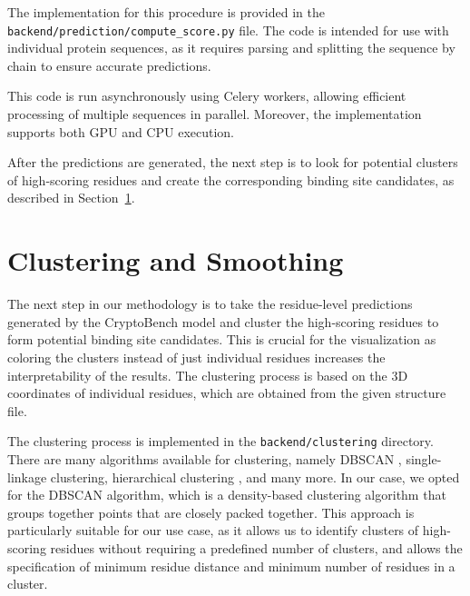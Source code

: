 \sloppy
The implementation for this procedure is provided in the \lstinline!backend/prediction/compute_score.py! file. The code is intended for use with individual protein sequences, as it requires parsing and splitting the sequence by chain to ensure accurate predictions.

This code is run asynchronously using Celery workers, allowing efficient processing of multiple sequences in parallel. Moreover, the implementation supports both GPU and CPU execution.

After the predictions are generated, the next step is to look for potential clusters of high-scoring residues and create the corresponding binding site candidates, as described in Section~\ref{sec:clustering}.

\section{Clustering and Smoothing}
\label{sec:clustering}

The next step in our methodology is to take the residue-level predictions generated by the CryptoBench model and cluster the high-scoring residues to form potential binding site candidates. This is crucial for the visualization as coloring the clusters instead of just individual residues increases the interpretability of the results. The clustering process is based on the 3D coordinates of individual residues, which are obtained from the given structure file.

The clustering process is implemented in the \lstinline!backend/clustering! directory. There are many algorithms available for clustering, namely DBSCAN \cite{schubert2017dbscan}, single-linkage clustering, hierarchical clustering \cite{jarman2020hierarchical}, and many more. In our case, we opted for the DBSCAN algorithm, which is a density-based clustering algorithm that groups together points that are closely packed together. This approach is particularly suitable for our use case, as it allows us to identify clusters of high-scoring residues without requiring a predefined number of clusters, and allows the specification of minimum residue distance and minimum number of residues in a cluster.

